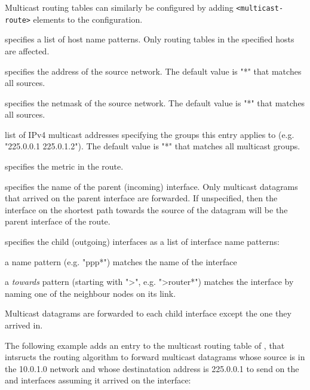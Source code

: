 Multicast routing tables can similarly be configured by adding
\verb!<multicast-route>! elements to the configuration.
\begin{compactitem}
 \item {} specifies a list of host name patterns.
   Only routing tables in the specified hosts are affected.

 \item {} specifies the address of the source network.
  The default value is "*" that matches all sources.

 \item {} specifies the netmask of the source network.
  The default value is "*" that matches all sources.

 \item {} list of IPv4 multicast addresses specifying the groups
   this entry applies to (e.g. "225.0.0.1 225.0.1.2").
   The default value is "*" that matches all multicast groups.

 \item {} specifies the metric in the route.

 \item {} specifies the name of the parent (incoming) interface.
   Only multicast datagrams that arrived on the parent interface are forwarded.
   If unspecified, then the interface on the shortest path towards the source
   of the datagram will be the parent interface of the route.

 \item {} specifies the child (outgoing) interfaces as a list of interface name
   patterns:
   \begin{compactitem}
    \item a name pattern (e.g. "ppp*") matches the name of the interface
    \item a \emph{towards} pattern (starting with ">", e.g. ">router*") matches
     the interface by naming one of the neighbour nodes on its link.
   \end{compactitem}
   Multicast datagrams are forwarded to each child interface except the
   one they arrived in.
\end{compactitem}

The following example adds an entry to the multicast routing table of ,
that intsructs the routing algorithm to forward multicast datagrams whose source
is in the 10.0.1.0 network and whose destinatation address is 225.0.0.1 to
send on the  and  interfaces assuming it arrived on the
 interface:
 
